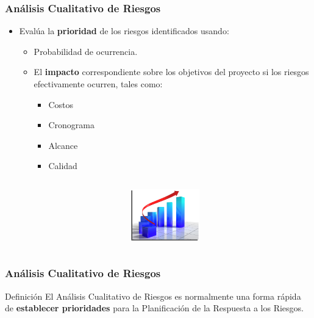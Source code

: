 \frame
{
\frametitle{Análisis Cualitativo de Riesgos}
\begin{itemize}
	\item Evalúa la \textbf{prioridad} de los riesgos identificados usando:
	\begin{itemize}
		\item Probabilidad de ocurrencia.
		\item El \textbf{impacto} correspondiente sobre los objetivos del
			proyecto si los riesgos efectivamente ocurren, tales como:
		\begin{itemize}
			\item Costos
			\item Cronograma
			\item Alcance
			\item Calidad
		\end{itemize}
	\end{itemize}
\end{itemize}
\begin{columns}
	\begin{column}{0.6\textwidth}
	\end{column}
	\begin{column}{0.4\textwidth}
		\includegraphics[width=3cm]{img/quality}
	\end{column}
\end{columns}
}

\frame
{
\frametitle{Análisis Cualitativo de Riesgos}
\begin{block}{Definición}
	El Análisis Cualitativo de Riesgos es normalmente una forma rápida de
	\textbf{establecer prioridades} para la Planificación de la Respuesta a los Riesgos.
\end{block}
}


